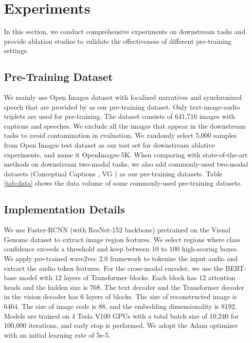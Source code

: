 \documentclass[10pt,twocolumn,letterpaper]{article}
\begin{document}
\section{Experiments}
In this section, we conduct comprehensive experiments on downstream tasks and provide ablation studies to validate the effectiveness of different pre-training settings. 

\subsection{Pre-Training Dataset}
We mainly use Open Images \cite{kuznetsova2020open} dataset with localized narratives and synchronized speech that are provided by \cite{pont2020connecting} as our pre-training dataset. Only text-image-audio triplets are used for pre-training. The dataset consists of 641,716 images with captions and speeches. We exclude all the images that appear in the downstream tasks to avoid contamination in evaluation. We randomly select 5,000 samples from Open Images test dataset as our test set for downstream ablative experiments, and name it OpenImages-5K. When comparing with state-of-the-art methods on downstream two-modal tasks, we also add commonly-used two-modal datasets (\eg Conceptual Captions \cite{sharma2018conceptual}, VG \cite{krishna2017visual}) as our pre-training datasets. Table \ref{tab:data} shows the data volume of some commonly-used pre-training datasets. 

\subsection{Implementation Details}
We use Faster-RCNN \cite{ren2015faster} (with ResNet-152 backbone) pretrained on the Visual Genome dataset \cite{krishna2017visual} to extract image region features. We select regions where class confidence exceeds a threshold and keep between 10 to 100 high-scoring boxes. We apply pre-trained wave2vec 2.0 \cite{wav2vec} framework to tokenize the input audio and extract the audio token features. For the cross-modal encoder, we use the BERT-base model \cite{bert} with 12 layers of Transformer blocks. Each block has 12 attention heads and the hidden size is 768. The text decoder and the Transformer decoder in the vision decoder has 6 layers of blocks. The size of reconstructed image is 6464. The size of image code is 88, and the embedding dimensionality is 8192. Models are trained on 4 Tesla V100 GPUs with a total batch size of 10,240 for 100,000 iterations, and early stop is performed. We adopt the Adam optimizer with an initial learning rate of 5e-5. 
\end{document}
